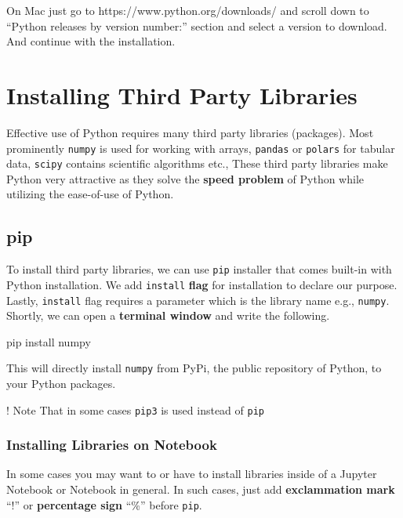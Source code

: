 \documentclass[
  letterpaper,
  DIV=11,
  numbers=noendperiod]{scrreprt}
\newenvironment{Shaded}{\begin{snugshade}}{\end{snugshade}}
\newcommand{\NormalTok}[1]{\textcolor[rgb]{0.00,0.23,0.31}{#1}}
\begin{document}
On Mac just go to https://www.python.org/downloads/ and scroll down to
``Python releases by version number:'' section and select a version to
download. And continue with the installation.

\chapter{Installing Third Party
Libraries}\label{installing-third-party-libraries}

Effective use of Python requires many third party libraries (packages).
Most prominently \texttt{numpy} is used for working with arrays,
\texttt{pandas} or \texttt{polars} for tabular data, \texttt{scipy}
contains scientific algorithms etc., These third party libraries make
Python very attractive as they solve the \textbf{speed problem} of
Python while utilizing the ease-of-use of Python.

\section{pip}\label{pip}

To install third party libraries, we can use \texttt{pip} installer that
comes built-in with Python installation. We add \texttt{install}
\textbf{flag} for installation to declare our purpose. Lastly,
\texttt{install} flag requires a parameter which is the library name
e.g., \texttt{numpy}. Shortly, we can open a \textbf{terminal window}
and write the following.

\begin{Shaded}
\begin{Highlighting}[]
\NormalTok{pip install numpy}
\end{Highlighting}
\end{Shaded}

This will directly install \texttt{numpy} from PyPi, the public
repository of Python, to your Python packages.

! Note That in some cases \texttt{pip3} is used instead of \texttt{pip}

\subsection{Installing Libraries on
Notebook}\label{installing-libraries-on-notebook}

In some cases you may want to or have to install libraries inside of a
Jupyter Notebook or Notebook in general. In such cases, just add
\textbf{exclammation mark} ``!'' or \textbf{percentage sign} ``\%''
before \texttt{pip}.
\end{document}
